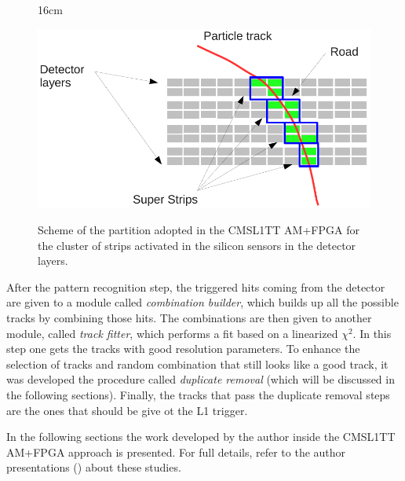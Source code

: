 \begin{figure}[htbp]{16cm}
	\caption{Scheme of the partition adopted in the CMSL1TT AM+FPGA for the cluster of strips activated in the silicon sensors in the detector layers.}
	\centering
	\includegraphics[scale=0.4]{AppendixCMSL1TT/figs/road_example}
	\label{fig:pattern_match}
\end{figure}

After the pattern recognition step, the triggered hits coming from the detector are given to a module called \textit{combination builder}, which builds up all the possible tracks by combining those hits. The combinations are then given to another module, called \textit{track fitter}, which performs a fit based on a linearized $\chi^{2}$. In this step one gets the tracks with good resolution parameters. To enhance the selection of tracks and random combination that still looks like a good track, it was developed the procedure called \textit{duplicate removal} (which will be discussed in the following sections). Finally, the tracks that pass the duplicate removal steps are the ones that should be give ot the L1 trigger.

In the following sections the work developed by the author inside the CMSL1TT AM+FPGA approach is presented. For full details, refer to the author presentations (\cite{bib:miqueias-cmsl1tt-19-01-16,bib:miqueias-cmsl1tt-14-04-16,bib:miqueias-cmsl1tt-19-04-16,bib:miqueias-cmsl1tt-27-04-17,bib:miqueias-cmsl1tt-17-08-17}) about these studies.


